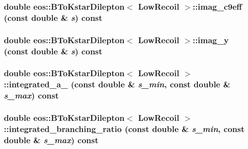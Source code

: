 \label{classeos_1_1BToKstarDilepton_3_01LowRecoil_01_4_a40fabc015bec286925c5d83a06ac35b5}
\hypertarget{classeos_1_1BToKstarDilepton_3_01LowRecoil_01_4_af322796e86288e0b0425fc2dbae20f8d}{
\subsubsection[{imag\_\-c9eff}]{\setlength{\rightskip}{0pt plus 5cm}double eos::BToKstarDilepton$<$ {\bf LowRecoil} $>$::imag\_\-c9eff (const double \& {\em s}) const}}
\label{classeos_1_1BToKstarDilepton_3_01LowRecoil_01_4_af322796e86288e0b0425fc2dbae20f8d}
\hypertarget{classeos_1_1BToKstarDilepton_3_01LowRecoil_01_4_ac0f2b68ee038536db3908a042b7b11cc}{
\subsubsection[{imag\_\-y}]{\setlength{\rightskip}{0pt plus 5cm}double eos::BToKstarDilepton$<$ {\bf LowRecoil} $>$::imag\_\-y (const double \& {\em s}) const}}
\label{classeos_1_1BToKstarDilepton_3_01LowRecoil_01_4_ac0f2b68ee038536db3908a042b7b11cc}
\hypertarget{classeos_1_1BToKstarDilepton_3_01LowRecoil_01_4_aa49cecdcb6cb3fe7a8bba8eff54910f6}{
\subsubsection[{integrated\_\-a\_\-9}]{\setlength{\rightskip}{0pt plus 5cm}double eos::BToKstarDilepton$<$ {\bf LowRecoil} $>$::integrated\_\-a\_ (const double \& {\em s\_\-min}, \/  const double \& {\em s\_\-max}) const}}
\label{classeos_1_1BToKstarDilepton_3_01LowRecoil_01_4_aa49cecdcb6cb3fe7a8bba8eff54910f6}
\hypertarget{classeos_1_1BToKstarDilepton_3_01LowRecoil_01_4_a58edd7101a9cb8aceb1f1ccfdd902b6b}{
\subsubsection[{integrated\_\-branching\_\-ratio}]{\setlength{\rightskip}{0pt plus 5cm}double eos::BToKstarDilepton$<$ {\bf LowRecoil} $>$::integrated\_\-branching\_\-ratio (const double \& {\em s\_\-min}, \/  const double \& {\em s\_\-max}) const}}

